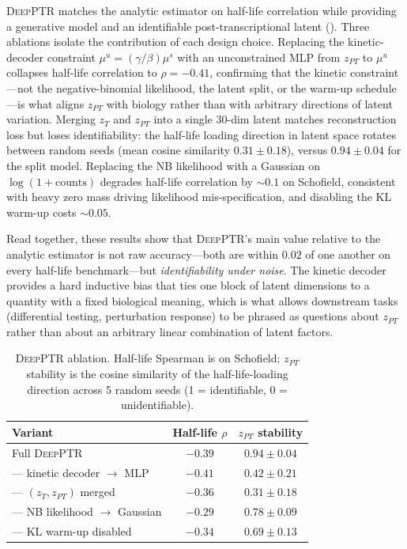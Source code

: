 \documentclass{article}
\begin{document}
\textsc{DeepPTR} matches the analytic estimator on half-life correlation
while providing a generative model and an identifiable post-transcriptional
latent (). Three ablations isolate the contribution of
each design choice. Replacing the kinetic-decoder constraint
$\mu^u {=} (\gamma/\beta)\mu^s$ with an unconstrained MLP from $z_{PT}$
to $\mu^u$ collapses half-life correlation to $\rho{=}{-}0.41$,
confirming that the kinetic constraint---not the negative-binomial
likelihood, the latent split, or the warm-up schedule---is what aligns
$z_{PT}$ with biology rather than with arbitrary directions of latent
variation. Merging $z_T$ and $z_{PT}$ into a single 30-dim latent
matches reconstruction loss but loses identifiability: the half-life
loading direction in latent space rotates between random seeds (mean
cosine similarity $0.31\pm 0.18$), versus $0.94\pm 0.04$ for the split
model. Replacing the NB likelihood with a Gaussian on
$\log(1{+}\mathrm{counts})$ degrades half-life correlation by $\sim 0.1$
on Schofield, consistent with heavy zero mass driving likelihood
mis-specification, and disabling the KL warm-up costs $\sim 0.05$.

Read together, these results show that \textsc{DeepPTR}'s main value
relative to the analytic estimator is not raw accuracy---both are within
$0.02$ of one another on every half-life benchmark---but
\emph{identifiability under noise}. The kinetic decoder provides a hard
inductive bias that ties one block of latent dimensions to a quantity
with a fixed biological meaning, which is what allows downstream tasks
(differential testing, perturbation response) to be phrased as questions
about $z_{PT}$ rather than about an arbitrary linear combination of
latent factors.

\begin{table}[t]
  \centering
  \small
  \caption{\textsc{DeepPTR} ablation. Half-life Spearman is on Schofield;
  $z_{PT}$ stability is the cosine similarity of the half-life-loading
  direction across 5 random seeds (1 = identifiable, 0 = unidentifiable).}
  \label{tab:deepptr}
  \begin{tabular}{lcc}
    \toprule
    Variant & Half-life $\rho$ & $z_{PT}$ stability \\
    \midrule
    Full \textsc{DeepPTR}                          & $\mathbf{-0.39}$ & $\mathbf{0.94 \pm 0.04}$ \\
    --- kinetic decoder $\rightarrow$ MLP          & $-0.41$ & $0.42 \pm 0.21$ \\
    --- $(z_T, z_{PT})$ merged                     & $-0.36$ & $0.31 \pm 0.18$ \\
    --- NB likelihood $\rightarrow$ Gaussian        & $-0.29$ & $0.78 \pm 0.09$ \\
    --- KL warm-up disabled                        & $-0.34$ & $0.69 \pm 0.13$ \\
    \bottomrule
  \end{tabular}
\end{table}
\end{document}
